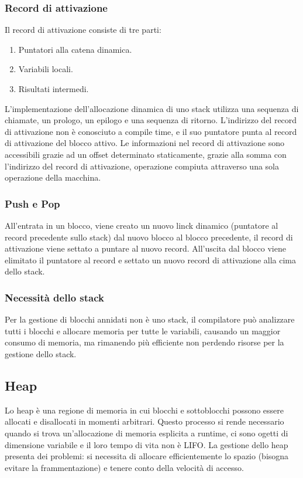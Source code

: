 \subsubsection{Record di attivazione}
Il record di attivazione consiste di tre parti:
\begin{enumerate}
\item Puntatori alla catena dinamica.
\item Variabili locali.
\item Risultati intermedi.
\end{enumerate}
L'implementazione dell'allocazione dinamica di uno stack utilizza una sequenza di chiamate, un prologo, un epilogo e una sequenza di ritorno. L'indirizzo del record di 
attivazione non \`e conosciuto a compile time, e il suo puntatore punta al record di attivazione del blocco attivo. Le informazioni nel record di attivazione sono accessibili
grazie ad un offset determinato staticamente, grazie alla somma con l'indirizzo del record di attivazione, operazione compiuta attraverso una sola operazione della macchina.
\subsubsection{Push e Pop}
All'entrata in un blocco, viene creato un nuovo linck dinamico (puntatore  al record precedente sullo stack) dal nuovo blocco al blocco precedente, il record di attivazione 
viene settato a puntare al nuovo record. All'uscita dal blocco viene elimitato il puntatore al record e settato un nuovo record di attivazione alla cima dello stack.
\subsubsection{Necessit\`a dello stack}
Per la gestione di blocchi annidati non \`e uno stack, il compilatore pu\`o analizzare tutti i blocchi e allocare memoria per tutte le variabili, causando un maggior consumo di 
memoria, ma rimanendo pi\`u efficiente non perdendo risorse per la gestione dello stack. 
\subsection{Heap}
Lo heap \`e una regione di memoria in cui blocchi e sottoblocchi possono essere allocati e disallocati in momenti arbitrari. Questo processo si rende necessario quando si trova
un'allocazione di memoria esplicita a runtime, ci sono ogetti di dimensione variabile e il loro tempo di vita non \`e LIFO. La gestione dello heap presenta dei problemi: si 
necessita di allocare efficientemente lo spazio (bisogna evitare la frammentazione) e tenere conto della velocit\`a di accesso. 
